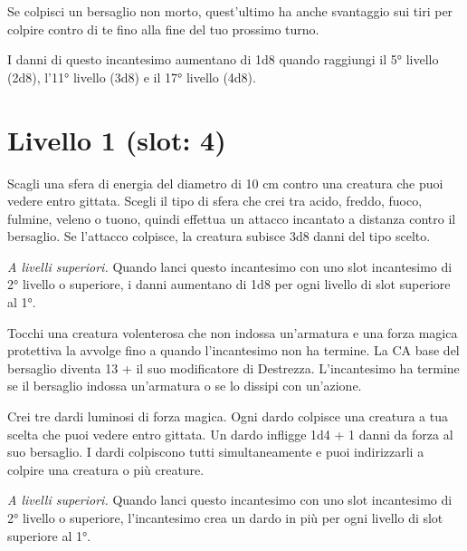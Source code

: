 \documentclass[letterpaper,twocolumn,openany,nodeprecatedcode,justified]{dndbook}
\begin{document}
Se colpisci un bersaglio non morto, quest'ultimo ha anche svantaggio sui tiri per colpire contro di te fino alla fine del tuo prossimo turno.

I danni di questo incantesimo aumentano di 1d8 quando raggiungi il 5° livello (2d8), l'11° livello (3d8) e il 17° livello (4d8).

\section{Livello 1 (slot: 4)}


Scagli una sfera di energia del diametro di 10 cm contro una creatura che puoi vedere entro gittata. Scegli il tipo di sfera che crei tra acido, freddo, fuoco, fulmine, veleno o tuono, quindi effettua un attacco incantato a distanza contro il bersaglio. Se l'attacco colpisce, la creatura subisce 3d8 danni del tipo scelto.

\emph{A livelli superiori.} Quando lanci questo incantesimo con uno slot incantesimo di 2° livello o superiore, i danni aumentano di 1d8 per ogni livello di slot superiore al 1°.


Tocchi una creatura volenterosa che non indossa un'armatura e una forza magica protettiva la avvolge fino a quando l'incantesimo non ha termine. La CA base del bersaglio diventa 13 + il suo modificatore di Destrezza. L'incantesimo ha termine se il bersaglio indossa un'armatura o se lo dissipi con un'azione.


Crei tre dardi luminosi di forza magica. Ogni dardo colpisce una creatura a tua scelta che puoi vedere entro gittata. Un dardo infligge 1d4 + 1 danni da forza al suo bersaglio. I dardi colpiscono tutti simultaneamente e puoi indirizzarli a colpire una creatura o più creature.

\emph{A livelli superiori.} Quando lanci questo incantesimo con uno slot incantesimo di 2° livello o superiore, l'incantesimo crea un dardo in più per ogni livello di slot superiore al 1°.

\end{document}

